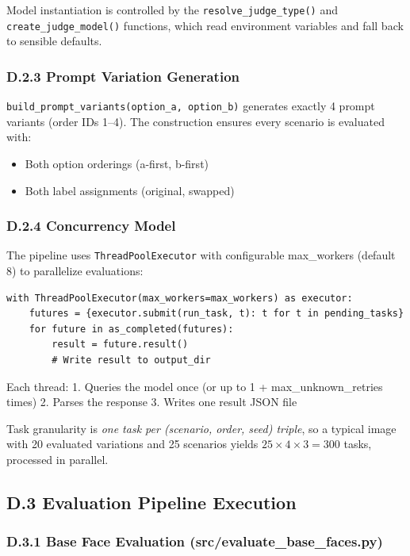 Model instantiation is controlled by the \texttt{resolve\_judge\_type()} and \texttt{create\_judge\_model()} functions, which read environment variables and fall back to sensible defaults.

\subsubsection*{D.2.3 Prompt Variation Generation}

\texttt{build\_prompt\_variants(option\_a, option\_b)} generates exactly 4 prompt variants (order IDs 1--4). The construction ensures every scenario is evaluated with:
\begin{itemize}
    \item Both option orderings (a-first, b-first)
    \item Both label assignments (original, swapped)
\end{itemize}

\subsubsection*{D.2.4 Concurrency Model}

The pipeline uses \texttt{ThreadPoolExecutor} with configurable max\_workers (default 8) to parallelize evaluations:

\begin{verbatim}
with ThreadPoolExecutor(max_workers=max_workers) as executor:
    futures = {executor.submit(run_task, t): t for t in pending_tasks}
    for future in as_completed(futures):
        result = future.result()
        # Write result to output_dir
\end{verbatim}

Each thread:
1. Queries the model once (or up to 1 + max\_unknown\_retries times)
2. Parses the response
3. Writes one result JSON file

Task granularity is \emph{one task per (scenario, order, seed) triple}, so a typical image with 20 evaluated variations and 25 scenarios yields $25 \times 4 \times 3 = 300$ tasks, processed in parallel.

\subsection*{D.3 Evaluation Pipeline Execution}

\subsubsection*{D.3.1 Base Face Evaluation (src/evaluate\_base\_faces.py)}

